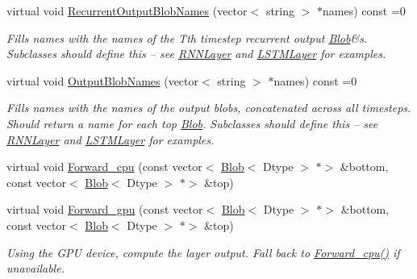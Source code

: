 \begin{DoxyCompactItemize}
\mbox{\label{classcaffe_1_1_recurrent_layer_a5fd43ae201c4284a1cc3d93f72702bbe}} 
virtual void \mbox{\hyperlink{classcaffe_1_1_recurrent_layer_a5fd43ae201c4284a1cc3d93f72702bbe}{Recurrent\+Output\+Blob\+Names}} (vector$<$ string $>$ $\ast$names) const =0
\begin{DoxyCompactList}\small\item\em Fills names with the names of the Tth timestep recurrent output \mbox{\hyperlink{classcaffe_1_1_blob}{Blob}}\&s. Subclasses should define this -- see \mbox{\hyperlink{classcaffe_1_1_r_n_n_layer}{R\+N\+N\+Layer}} and \mbox{\hyperlink{classcaffe_1_1_l_s_t_m_layer}{L\+S\+T\+M\+Layer}} for examples. \end{DoxyCompactList}\item 
\mbox{\label{classcaffe_1_1_recurrent_layer_af0b87f8e9a422338243ffeb7f16121fa}} 
virtual void \mbox{\hyperlink{classcaffe_1_1_recurrent_layer_af0b87f8e9a422338243ffeb7f16121fa}{Output\+Blob\+Names}} (vector$<$ string $>$ $\ast$names) const =0
\begin{DoxyCompactList}\small\item\em Fills names with the names of the output blobs, concatenated across all timesteps. Should return a name for each top \mbox{\hyperlink{classcaffe_1_1_blob}{Blob}}. Subclasses should define this -- see \mbox{\hyperlink{classcaffe_1_1_r_n_n_layer}{R\+N\+N\+Layer}} and \mbox{\hyperlink{classcaffe_1_1_l_s_t_m_layer}{L\+S\+T\+M\+Layer}} for examples. \end{DoxyCompactList}\item 
virtual void \mbox{\hyperlink{classcaffe_1_1_recurrent_layer_a9f0e34d7534fac027c640e66f55a18d2}{Forward\+\_\+cpu}} (const vector$<$ \mbox{\hyperlink{classcaffe_1_1_blob}{Blob}}$<$ Dtype $>$ $\ast$$>$ \&bottom, const vector$<$ \mbox{\hyperlink{classcaffe_1_1_blob}{Blob}}$<$ Dtype $>$ $\ast$$>$ \&top)
\item 
\mbox{\label{classcaffe_1_1_recurrent_layer_afb4cdbb38b24d2a2ccb14cebc4e1018b}} 
virtual void \mbox{\hyperlink{classcaffe_1_1_recurrent_layer_afb4cdbb38b24d2a2ccb14cebc4e1018b}{Forward\+\_\+gpu}} (const vector$<$ \mbox{\hyperlink{classcaffe_1_1_blob}{Blob}}$<$ Dtype $>$ $\ast$$>$ \&bottom, const vector$<$ \mbox{\hyperlink{classcaffe_1_1_blob}{Blob}}$<$ Dtype $>$ $\ast$$>$ \&top)
\begin{DoxyCompactList}\small\item\em Using the G\+PU device, compute the layer output. Fall back to \mbox{\hyperlink{classcaffe_1_1_recurrent_layer_a9f0e34d7534fac027c640e66f55a18d2}{Forward\+\_\+cpu()}} if unavailable. \end{DoxyCompactList}\item 

\end{DoxyCompactItemize}

